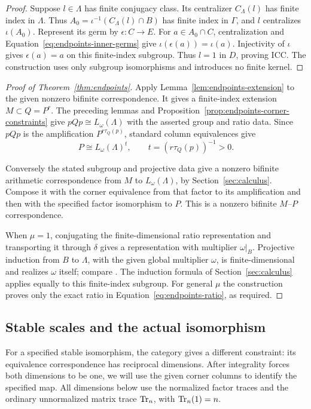 \begin{proof}
Suppose \(l\in\Lambda\) has finite conjugacy class. Its centralizer
$C_\Lambda(l)$ has finite index in \(\Lambda\). Thus
$A_0=\iota^{-1}(C_\Lambda(l)\cap B)$ has finite index in
$\Gamma$, and $l$ centralizes \(\iota(A_0)\).
Represent its germ by \(\epsilon:C\to E\).  For
\(a\in A_0\cap C\), centralization and
Equation~\eqref{eq:endpoints-inner-germs} give
\(\iota(\epsilon(a))=\iota(a)\).
Injectivity of \(\iota\) gives \(\epsilon(a)=a\) on this
finite-index subgroup.  Thus \(l=1\) in \(D\), proving ICC.
The construction uses only subgroup isomorphisms and introduces no
finite kernel.
\end{proof}

\begin{proof}[Proof of Theorem~\ref{thm:endpoints}]
Apply Lemma~\ref{lem:endpoints-extension} to the given nonzero bifinite
correspondence. It gives a finite-index extension
\(M\subset Q=P^r\).  The preceding lemmas and
Proposition~\ref{prop:endpoints-corner-constraints} give
\(pQp\cong L_\omega(\Lambda)\) with the asserted group and ratio
data.  Since \(pQp\) is the amplification
\(P^{r\tau_Q(p)}\), standard column equivalences give
\[
 P\cong L_\omega(\Lambda)^t,
 \qquad t=(r\tau_Q(p))^{-1}>0.
\]

Conversely the stated subgroup and projective data give a nonzero
bifinite arithmetic correspondence from \(M\) to
\(L_\omega(\Lambda)\), by Section~\ref{sec:calculus}.
Compose it with the corner equivalence from that factor to its
amplification and then with the specified factor isomorphism to \(P\).
This is a nonzero bifinite \(M\)--\(P\) correspondence.

When \(\mu=1\), conjugating the finite-dimensional ratio
representation and transporting it through \(\delta\) gives a
representation with multiplier \(\omega|_B\).  Projective induction
from \(B\) to \(\Lambda\), with the given global multiplier
\(\omega\), is finite-dimensional and realizes \(\omega\) itself;
compare \cite[Lemmas~6.7--6.8]{DonvilVaes2025}. The induction formula of Section~\ref{sec:calculus} applies equally to
this finite-index subgroup.  For general \(\mu\) the construction
proves only the exact ratio in Equation~\eqref{eq:endpoints-ratio},
as required.
\end{proof}

\subsection{Stable scales and the actual isomorphism}

For a specified stable isomorphism, the category gives a different
constraint: its equivalence correspondence has reciprocal dimensions.
After integrality forces both dimensions to be one, we will use the
given corner columns to identify the specified map. All dimensions below
use the normalized factor traces and the ordinary unnormalized matrix
trace $\operatorname{Tr}_n$, with $\operatorname{Tr}_n(1)=n$.

